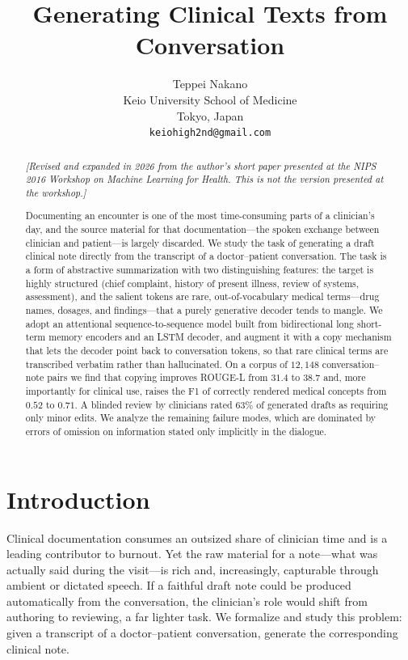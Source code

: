 \documentclass{article}
\title{Generating Clinical Texts from Conversation}
\author{
  Teppei Nakano \\
  Keio University School of Medicine \\
  Tokyo, Japan \\
  \texttt{keiohigh2nd@gmail.com}
}
\begin{document}
\maketitle

\begin{abstract}
\noindent\textit{[Revised and expanded in 2026 from the author's short paper presented at the NIPS 2016 Workshop on Machine Learning for Health. This is not the version presented at the workshop.]}\par\smallskip

Documenting an encounter is one of the most time-consuming parts of a clinician's
day, and the source material for that documentation---the spoken exchange between
clinician and patient---is largely discarded. We study the task of generating a
draft clinical note directly from the transcript of a doctor--patient conversation.
The task is a form of abstractive summarization with two distinguishing features:
the target is highly structured (chief complaint, history of present illness,
review of systems, assessment), and the salient tokens are rare, out-of-vocabulary
medical terms---drug names, dosages, and findings---that a purely generative
decoder tends to mangle. We adopt an attentional sequence-to-sequence model built
from bidirectional long short-term memory encoders and an LSTM decoder, and augment
it with a copy mechanism that lets the decoder point back to conversation tokens,
so that rare clinical terms are transcribed verbatim rather than hallucinated. On a
corpus of $12{,}148$ conversation--note pairs we find that copying improves ROUGE-L
from $31.4$ to $38.7$ and, more importantly for clinical use, raises the F1 of
correctly rendered medical concepts from $0.52$ to $0.71$. A blinded review by
clinicians rated $63\%$ of generated drafts as requiring only minor edits. We
analyze the remaining failure modes, which are dominated by errors of omission on
information stated only implicitly in the dialogue.
\end{abstract}

\section{Introduction}

Clinical documentation consumes an outsized share of clinician time and is a
leading contributor to burnout. Yet the raw material for a note---what was actually
said during the visit---is rich and, increasingly, capturable through ambient or
dictated speech. If a faithful draft note could be produced automatically from the
conversation, the clinician's role would shift from authoring to reviewing, a far
lighter task. We formalize and study this problem: given a transcript of a
doctor--patient conversation, generate the corresponding clinical note.
\end{document}
